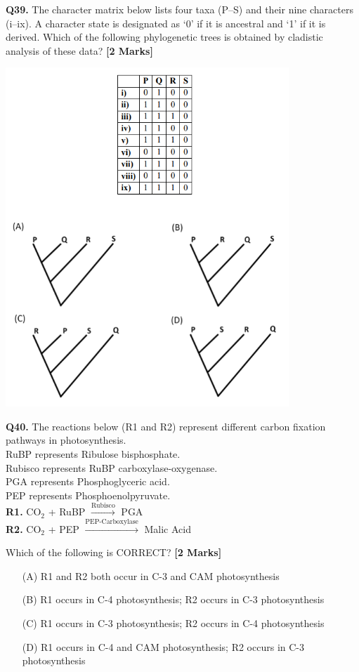 \documentclass[11pt]{article}
\newcommand{\questionb}[2]{
    \noindent\textbf{Q#2.} #1 \hfill \textbf{[2 Marks]}
}
\begin{document}
\questionb{The character matrix below lists four taxa (P–S) and their nine characters (i–ix). A character state is designated as ‘0’ if it is ancestral and ‘1’ if it is derived. Which of the following phylogenetic trees is obtained by cladistic analysis of these data?}{39}
\begin{center}
\includegraphics[width=0.8\textwidth]{figures/39}
\end{center}
\vspace{0.5cm}

\questionb{The reactions below (R1 and R2) represent different carbon fixation pathways in photosynthesis.\\
RuBP represents Ribulose bisphosphate.\\
Rubisco represents RuBP carboxylase-oxygenase.\\
PGA represents Phosphoglyceric acid.\\
PEP represents Phosphoenolpyruvate.\\

\textbf{R1.} CO\(_2\) + RuBP \(\xrightarrow{\text{Rubisco}}\) PGA\\
\textbf{R2.} CO\(_2\) + PEP \(\xrightarrow{\text{PEP-Carboxylase}}\) Malic Acid

Which of the following is CORRECT?}{40}
\begin{enumerate}
    \item[(A)] R1 and R2 both occur in C-3 and CAM photosynthesis
    \item[(B)] R1 occurs in C-4 photosynthesis; R2 occurs in C-3 photosynthesis
    \item[(C)] R1 occurs in C-3 photosynthesis; R2 occurs in C-4 photosynthesis
    \item[(D)] R1 occurs in C-4 and CAM photosynthesis; R2 occurs in C-3 photosynthesis
\end{enumerate}
\vspace{0.5cm}
\end{document}
